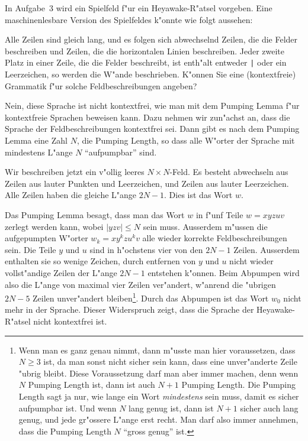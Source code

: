 In Aufgabe~3 wird ein Spielfeld f"ur ein Heyawake-R"atsel vorgeben.
Eine maschinenlesbare Version des Spielfeldes k"onnte wie 
folgt aussehen:
\begin{center}
\small
{}
\end{center}
Alle Zeilen sind gleich lang, und es folgen sich abwechselnd Zeilen,
die die Felder beschreiben und Zeilen, die die horizontalen Linien
beschreiben.
Jeder zweite Platz in einer Zeile, die die Felder beschreibt, ist
enth"alt entweder \texttt{|} oder ein Leerzeichen, so werden die W"ande
beschrieben.
K"onnen Sie eine (kontextfreie) Grammatik f"ur solche Feldbeschreibungen
angeben?

\begin{loesung}
Nein, diese Sprache ist nicht kontextfrei, wie man mit dem 
Pumping Lemma f"ur kontextfreie Sprachen beweisen kann.
Dazu nehmen wir zun"achst an, dass die Sprache der Feldbeschreibungen
kontextfrei sei. Dann gibt es nach dem Pumping Lemma eine Zahl $N$,
die Pumping Length, so dass alle W"orter der Sprache mit mindestens
L"ange $N$ ``aufpumpbar'' sind.

Wir beschreiben jetzt ein v"ollig leeres $N\times N$-Feld. Es besteht
abwechseln aus Zeilen aus lauter Punkten und Leerzeichen, und Zeilen
aus lauter Leerzeichen. Alle Zeilen haben die gleiche L"ange $2N-1$.
Dies ist das Wort $w$.

Das Pumping Lemma besagt, dass man das Wort  $w$ in f"unf Teile
$w=xyzuv$ zerlegt werden kann, wobei $|yzv|\le N$ sein muss.
Ausserdem m"ussen die aufgepumpten W"orter $w_k=xy^kzu^kv$ alle wieder
korrekte Feldbeschreibungen sein.
Die Teile $y$ und $u$ sind in h"ochstens vier von den $2N-1$ Zeilen.
Ausserdem enthalten sie so wenige Zeichen, durch entfernen von
$y$ und $u$ nicht wieder vollst"andige Zeilen der L"ange $2N-1$ entstehen
k"onnen.
Beim Abpumpen wird also die L"ange von maximal vier Zeilen ver"andert,
w"anrend die "ubrigen $2N-5$ Zeilen unver"andert bleiben\footnote{Wenn man
es ganz genau nimmt, dann m"usste man hier voraussetzen, dass $N \ge 3$ ist,
da man sonst nicht sicher sein kann, dass eine unver"anderte Zeile
"ubrig bleibt. Diese Voraussetzung darf man aber immer machen, denn
wenn $N$ Pumping Length ist, dann ist auch $N+1$ Pumping Length.
Die Pumping Length sagt ja nur, wie lange ein Wort {\em mindestens} sein
muss, damit es sicher aufpumpbar ist. Und wenn $N$ lang genug ist, dann ist
$N+1$ sicher auch lang genug, und jede gr"ossere L"ange erst recht.
Man darf also immer annehmen, dass die Pumping Length $N$ ``gross genug'' ist.}.
Durch das Abpumpen ist das Wort $w_0$ nicht mehr in der Sprache.
Dieser Widerspruch zeigt, dass die Sprache der Heyawake-R"atsel nicht
kontextfrei ist.
\end{loesung}

